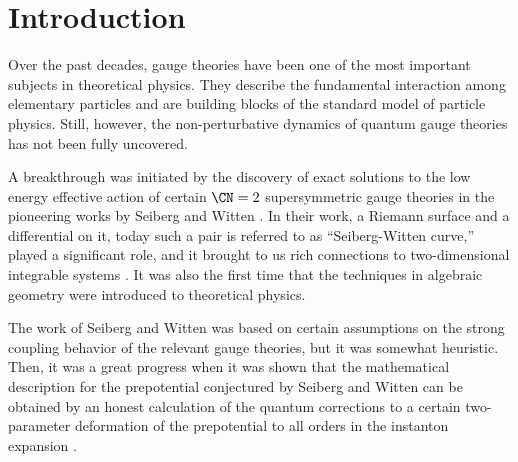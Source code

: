 \begin{comment}
\documentclass[11pt]{article}  %
\usepackage{Common/toshi}

\end{comment}



\section{Introduction}
\label{sec:intro}


Over the past decades, gauge theories have been one of the most
important subjects in theoretical physics.
They describe the fundamental interaction among elementary particles
and are building blocks of the standard model of particle physics.
Still, however, the non-perturbative dynamics of quantum gauge theories
has not been fully uncovered.

A breakthrough was initiated by the discovery of exact solutions to
the low energy effective action of certain $\CN=2$ supersymmetric gauge
theories in the pioneering works by Seiberg and Witten \cite{Seiberg:1994rs,Seiberg:1994aj}.
In their work, a Riemann surface and a differential on it, today such a pair is referred to as
``Seiberg-Witten curve,'' played a significant role, and it brought to us
rich connections to two-dimensional integrable systems \cite{Gorsky:1995zq,Martinec:1995by,Donagi:1995cf}.
It was also the first time that the techniques in algebraic geometry were introduced
to theoretical physics.

The work of Seiberg and Witten was based on certain assumptions on the strong coupling
behavior of the relevant gauge theories, but it was somewhat heuristic.
Then, it was a great progress when it was shown that the mathematical description for
the prepotential conjectured by Seiberg and Witten can be obtained by an honest
calculation of the quantum corrections to a certain two-parameter
deformation of the prepotential to all orders in the instanton
expansion \cite{Nekrasov:2002qd,Nekrasov:2003rj,Nakajima:2003pg}.

